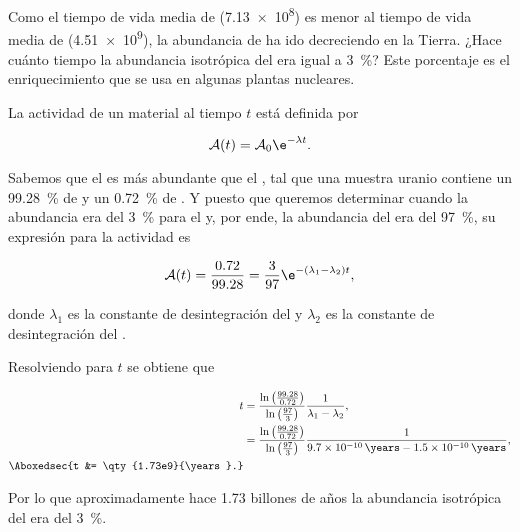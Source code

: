 \documentclass[./../main.tex]{subfiles}
\begin{document}
    \begin{exercise}
        Como el tiempo de vida media de  (\qty{7.13e8}{\years}) es menor al tiempo de vida media de  (\qty{4.51e9}{\years}), la abundancia de  ha ido decreciendo en la Tierra. ¿Hace cuánto tiempo la abundancia isotrópica del  era igual a \SI{3}{\percent}? Este porcentaje es el enriquecimiento que se usa en algunas plantas nucleares.

        \begin{solution}
            La actividad de un material al tiempo \(t\) está definida por

			\begin{equation}
				\mathcal{A}(t) = \mathcal{A}_{0}\e^{-\lambda t}.
				\label{eq:activity}
			\end{equation}

            Sabemos que el  es más abundante que el , tal que una muestra uranio contiene un \qty{99.28}{\percent} de  y un \qty{0.72}{\percent} de . Y puesto que queremos determinar cuando la abundancia era del \qty{3}{\percent} para el  y, por ende, la abundancia del  era del \qty{97}{\percent}, su expresión para la actividad es

            \begin{equation*}
                \mathcal{A}(t) = \dfrac{\num{0.72}}{\num{99.28}} = \dfrac{3}{97}\e^{-(\lambda_{1} - \lambda_{2})t},
            \end{equation*}

            donde \(\lambda_{1}\) es la constante de desintegración del  y \(\lambda_{2}\) es la constante de desintegración del . 

            Resolviendo para \(t\) se obtiene que

            \begin{align*}
                t &= \dfrac{\ln\left(\tfrac{\num{99.28}}{\num{0.72}}\right)}{\ln\left(\tfrac{97}{3}\right)}\dfrac{1}{\lambda_{1} - \lambda_{2}},\\
                &= \dfrac{\ln\left(\tfrac{\num{99.28}}{\num{0.72}}\right)}{\ln\left(\tfrac{97}{3}\right)}\dfrac{1}{\qty{9.7e-10}{\years} - \qty{1.5e-10}{\years}},\\
                \Aboxedsec{t &= \qty{1.73e9}{\years}.}
            \end{align*}

            Por lo que aproximadamente hace \num{1.73} billones de años la abundancia isotrópica del  era del \SI{3}{\percent}.

        \end{solution}
    \end{exercise}
\end{document}
